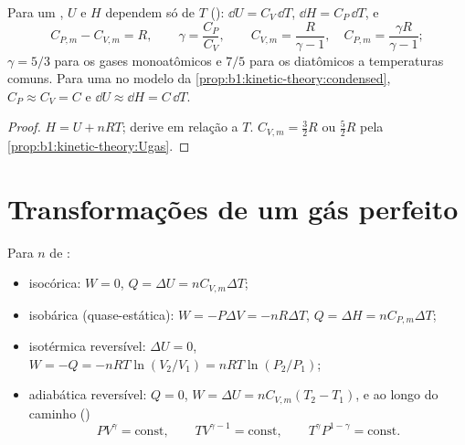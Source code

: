 \begin{proposition}\label{prop:b1:first-law:gas}
Para um , $U$ e $H$ dependem só de $T$ ():
$\dd U = C_V\,\dd T$, $\dd H = C_P\,\dd T$, e
\[
C_{P,m} - C_{V,m} = R, \qquad \gamma = \frac{C_P}{C_V}, \qquad
C_{V,m} = \frac{R}{\gamma - 1}, \quad C_{P,m} = \frac{\gamma R}{\gamma - 1} ;
\]
$\gamma = 5/3$ para os gases monoatômicos e $7/5$ para os diatômicos a
temperaturas comuns. Para uma  no modelo da
\cref{prop:b1:kinetic-theory:condensed}, $C_P \approx C_V = C$ e
$\dd U \approx \dd H = C\,\dd T$.
\end{proposition}

\begin{proof}
$H = U + nRT$; derive em relação a $T$. $C_{V,m} = \tfrac32 R$ ou
$\tfrac52 R$ pela \cref{prop:b1:kinetic-theory:Ugas}.
\end{proof}

\section{Transformações de um gás perfeito}

\begin{proposition}\label{prop:b1:first-law:transformations}
Para $n$  de :
\begin{itemize}
  \item isocórica: $W = 0$, $Q = \Delta U = nC_{V,m}\Delta T$;
  \item isobárica (quase-estática): $W = -P\Delta V = -nR\Delta T$, $Q = \Delta H =
        nC_{P,m}\Delta T$;
  \item isotérmica reversível: $\Delta U = 0$, $W = -Q = -nRT\ln(V_2/V_1) =
        nRT\ln(P_2/P_1)$;
  \item adiabática reversível: $Q = 0$, $W = \Delta U = nC_{V,m}(T_2 - T_1)$,
        e ao longo do caminho (\emph{})
        \[
        PV^\gamma = \text{const}, \qquad TV^{\gamma - 1} = \text{const}, \qquad
        T^\gamma P^{1 - \gamma} = \text{const} .
        \]
\end{itemize}
\end{proposition}

